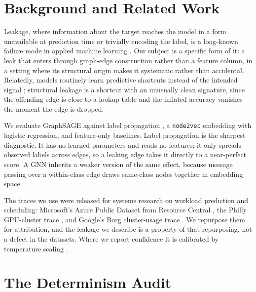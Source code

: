 \documentclass[11pt]{article}
\newcommand{\code}[1]{\texttt{#1}}
\begin{document}
\section{Background and Related Work}

Leakage, where information about the target reaches the model in a form
unavailable at prediction time or trivially encoding the label, is a long-known
failure mode in applied machine learning \citep{kaufman2012leakage}. Our
subject is a specific form of it: a leak that enters through graph-edge
construction rather than a feature column, in a setting where its structural
origin makes it systematic rather than accidental. Relatedly, models routinely
learn predictive shortcuts instead of the intended signal
\citep{geirhos2020shortcut}; structural leakage is a shortcut with an unusually
clean signature, since the offending edge is close to a lookup table and the
inflated accuracy vanishes the moment the edge is dropped.

We evaluate GraphSAGE \citep{hamilton2017graphsage} against label propagation
\citep{zhu2002labelprop}, a \code{node2vec} embedding \citep{grover2016node2vec}
with logistic regression, and feature-only baselines. Label propagation is the
sharpest diagnostic. It has no learned parameters and reads no features; it only
spreads observed labels across edges, so a leaking edge takes it directly to a
near-perfect score. A GNN inherits a weaker version of the same effect, because
message passing over a within-class edge draws same-class nodes together in
embedding space.

The traces we use were released for systems research on workload prediction and
scheduling: Microsoft's Azure Public Dataset from Resource Central
\citep{cortez2017resourcecentral}, the Philly GPU-cluster trace
\citep{jeon2019philly}, and Google's Borg cluster-usage trace
\citep{tirmazi2020borg}. We repurpose them for attribution, and the leakage we
describe is a property of that repurposing, not a defect in the datasets. Where
we report confidence it is calibrated by temperature scaling
\citep{guo2017calibration}.

\section{The Determinism Audit}
\label{sec:method}
\end{document}
